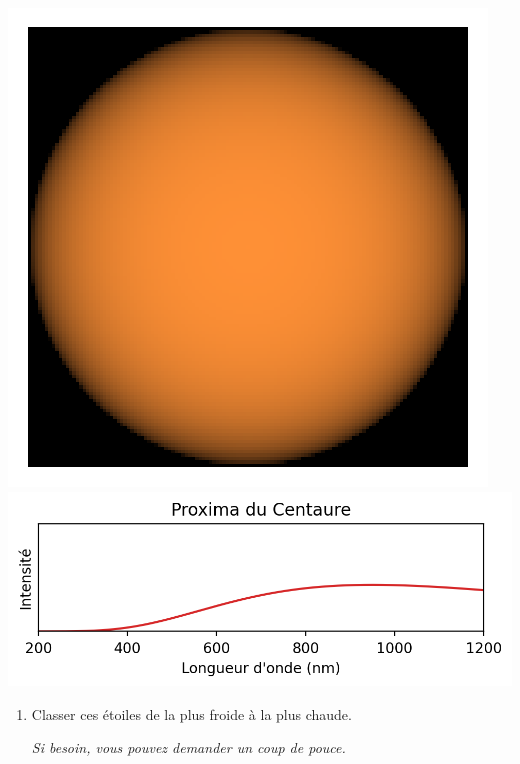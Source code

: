 \documentclass[12pt,a4paper,fleqn]{article}
\newcommand{\thumbsup}{\marginpar{\faThumbsOUp}}
\begin{document}
\begin{center}
\includegraphics[height=\localheight]{images/star_proxima_centauri.png}
\includegraphics[height=\localheight]{images/spectrum_star_curve_proxima_centauri.png}
\end{center}

\begin{enumerate}[resume]
\item \anarai{}

Classer ces étoiles de la plus froide à la plus chaude.

\textit{Si besoin, vous pouvez demander un coup de pouce.} \thumbsup
\end{enumerate}

\begin{center}
\end{center}
\end{document}
